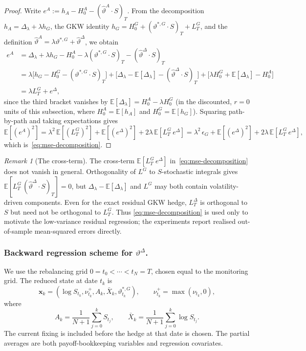 \documentclass[10pt,a4paper,reqno]{amsart}
\theoremstyle{plain}
\theoremstyle{definition}
\theoremstyle{remark}
\newtheorem{remark}[theorem]{Remark}
\theoremstyle{example}
\begin{document}
\begin{proof}
Write $e^A:= h_A -H_0^A -(\hat\vartheta^A\cdot S)_T$. From the decomposition $h_A=\Delta_\lambda+\lambda h_G$, the GKW identity $h_G=H_0^G+(\vartheta^{*,G}\cdot S)_T+L_T^G$, and the definition $\hat\vartheta^A=\lambda\vartheta^{*,G}+\hat\vartheta^\Delta$, we obtain
\begin{align*}
  e^A &= \Delta_\lambda + \lambda h_G - H_0^A - \lambda(\vartheta^{*,G}\cdot S)_T - (\hat\vartheta^\Delta\cdot S)_T \\
  &= \lambda\bigl[h_G-H_0^G-(\vartheta^{*,G}\cdot S)_T\bigr] + \bigl[\Delta_\lambda-\mathbb{E}[\Delta_\lambda]-(\hat\vartheta^\Delta\cdot S)_T\bigr] + \bigl[\lambda H_0^G+\mathbb{E}[\Delta_\lambda]-H_0^A\bigr] \\
  &= \lambda L_T^G + e^\Delta,
\end{align*}
since the third bracket vanishes by $\mathbb{E}[\Delta_\lambda]=H_0^A-\lambda H_0^G$ (in the discounted, $r=0$ units of this subsection, where $H_0^A=\mathbb{E}[h_A]$ and $H_0^G=\mathbb{E}[h_G]$). Squaring path-by-path and taking expectations gives
$$
    \mathbb{E}[(e^A)^2] = \lambda^2\,\mathbb{E}[(L_T^G)^2] + \mathbb{E}[(e^\Delta)^2] + 2\lambda\,\mathbb{E}[L_T^G\,e^\Delta] = \lambda^2\,\epsilon_G + \mathbb{E}[(e^\Delta)^2] + 2\lambda\,\mathbb{E}[L_T^G\,e^\Delta],
$$
which is~\eqref{eq:mse-decomposition}.
\end{proof}

\begin{remark}[The cross-term]\label{rem:mse-bound}
The cross-term $\mathbb{E}[L_T^G\,e^\Delta]$ in~\eqref{eq:mse-decomposition} does not vanish in general. Orthogonality of $L^G$ to $S$-stochastic integrals gives $\mathbb{E}[L_T^G\,(\hat\vartheta^\Delta\cdot S)_T]=0$, but $\Delta_\lambda-\mathbb{E}[\Delta_\lambda]$ and $L^G$ may both contain volatility-driven components. Even for the exact residual GKW hedge, $L_T^\Delta$ is orthogonal to $S$ but need not be orthogonal to $L_T^G$. Thus \eqref{eq:mse-decomposition} is used only to motivate the low-variance residual regression; the experiments report realised out-of-sample mean-squared errors directly.
\end{remark}

 \subsubsection*{Backward regression scheme for \(\vartheta^\Delta\).}
We use the rebalancing grid \(0=t_0<\cdots<t_N=T\), chosen equal to the monitoring grid.  The
reduced state at date \(t_k\) is
\[
 \mathbf x_k=(\log S_{t_k},\nu_{t_k}^+,A_k,\bar X_k,\vartheta_{t_k}^{*,G}),
 \qquad \nu_{t_k}^+=\max(\nu_{t_k},0),
\]
where
 \[
 A_k=\frac{1}{N+1}\sum_{j=0}^kS_{t_j},
 \qquad
 \bar X_k=\frac{1}{N+1}\sum_{j=0}^k\log S_{t_j}.
\]
 The current fixing is included before the  hedge at  that date is chosen.  The partial averages are
both payoff-bookkeeping variables and regression covariates.
\end{document}

